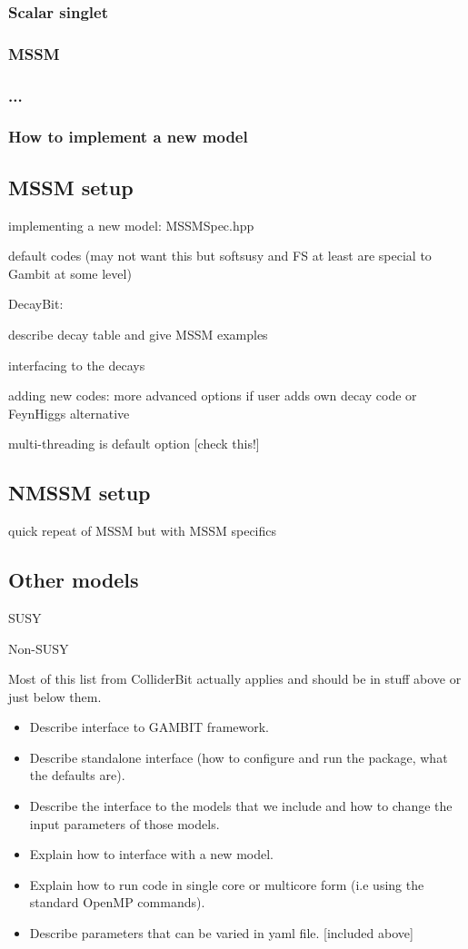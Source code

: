 \documentclass[11pt,a4paper]{article}
\begin{document}
\subsubsection{Scalar singlet}
\subsubsection{MSSM}
\subsubsection{...}
\subsubsection{How to implement a new model}

\subsection{MSSM setup} 


implementing a new model: MSSMSpec.hpp

default codes 
         (may not want this but softsusy and FS at least 
                         are special to Gambit at some level) 

DecayBit: 

describe decay table and give MSSM examples

interfacing to the decays

adding new codes: more advanced options if user adds own decay code or FeynHiggs alternative
 
multi-threading is default option [check this!]

\subsection{NMSSM setup}

    quick repeat of MSSM but with MSSM specifics


\subsection{Other models}
 
    SUSY

    Non-SUSY


Most of this list from ColliderBit actually applies and should be in stuff above or just below them.
\begin{itemize}
\item Describe interface to GAMBIT framework.
\item Describe standalone interface (how to configure and run the package, what the defaults are).
\item Describe the interface to the models that we include and how to change the input parameters of those models.
\item Explain how to interface with a new model.
\item Explain how to run code in single core or multicore form (i.e using the standard OpenMP commands).
\item Describe parameters that can be varied in yaml file. [included above]
\end{itemize}
\end{document}
